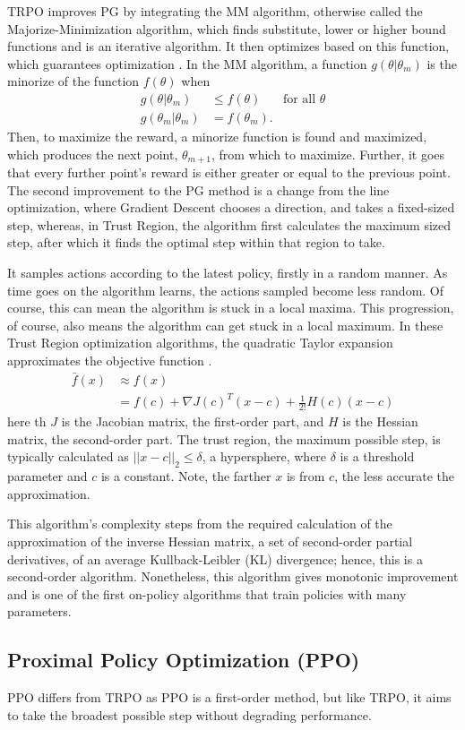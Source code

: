 TRPO improves PG by integrating the MM algorithm, otherwise called the Majorize-Minimization algorithm, which finds substitute, lower or higher bound functions and is an iterative algorithm. It then optimizes based on this function, which guarantees optimization \cite{lange_2007}. In the MM algorithm, a function $g(\theta|\theta_m)$ is the minorize of the function $f(\theta)$ when 
\begin{align*}
	g(\theta|\theta_m)&\leq f(\theta) &\text{for all }\theta\\
	g(\theta_m|\theta_m)&=f(\theta_m). 
\end{align*} Then, to maximize the reward, a minorize function is found and maximized, which produces the next point, $\theta_{m+1}$, from which to maximize. Further, it goes that every further point's reward is either greater or equal to the previous point. The second improvement to the PG method is a change from the line optimization, where Gradient Descent chooses a direction, and takes a fixed-sized step, whereas, in Trust Region, the algorithm first calculates the maximum sized step, after which it finds the optimal step within that region to take.

It samples actions according to the latest policy, firstly in a random manner. As time goes on the algorithm learns, the actions sampled become less random. Of course, this can mean the algorithm is stuck in a local maxima. This progression, of course, also means the algorithm can get stuck in a local maximum. In these Trust Region optimization algorithms, the quadratic Taylor expansion approximates the objective function \cite{nocedal_wright_2006}. \begin{align*}
	\bar{f}(x)&\approx f(x) \\
	&=f(c)+\nabla J(c)^T(x-c) + \frac{1}{2!}H(c)(x-c)
\end{align*} here th $J$ is the Jacobian matrix, the first-order part, and $H$ is the Hessian matrix, the second-order part. The trust region, the maximum possible step, is typically calculated as $||x-c||_2\leq \delta$, a hypersphere, where $\delta$ is a threshold parameter and $c$ is a constant. Note, the farther $x$ is from $c$, the less accurate the approximation.

This algorithm's complexity steps from the required calculation of the approximation of the inverse Hessian matrix, a set of second-order partial derivatives, of an average Kullback-Leibler (KL) divergence; hence, this is a second-order algorithm. Nonetheless, this algorithm gives monotonic improvement and is one of the first on-policy algorithms that train policies with many parameters. 

\subsection{Proximal Policy Optimization (PPO)}

PPO differs from TRPO as PPO is a first-order method, but like TRPO, it aims to take the broadest possible step without degrading performance.